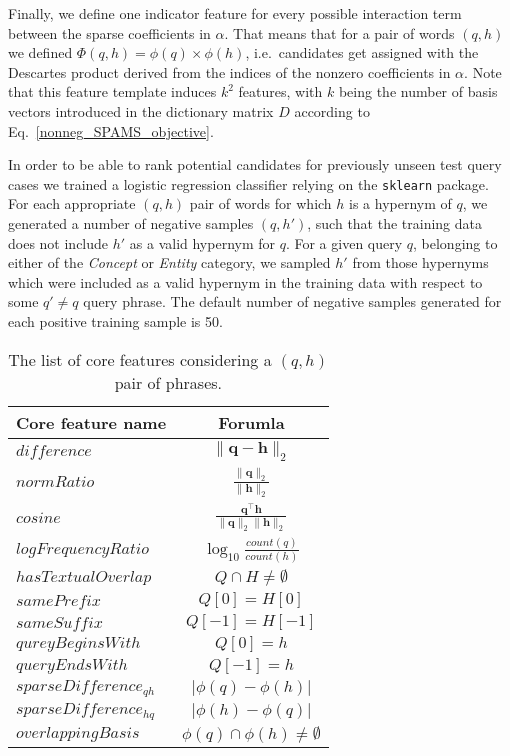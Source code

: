 \documentclass[11pt,a4paper]{article}
\begin{document}
Finally, we define one indicator feature for every possible interaction term
between the sparse coefficients in $\alpha$. That means that for a pair of
words $(q, h)$ we defined $\Phi(q,h)=\phi(q) \times \phi(h)$, i.e.~candidates
get assigned with the Descartes product derived from the indices of the nonzero
coefficients in $\alpha$. Note that this feature template induces $k^2$
features, with $k$ being the number of basis vectors introduced in the dictionary matrix $D$ according to Eq.~\ref{nonneg_SPAMS_objective}.

In order to be able to rank potential candidates for previously unseen test
query cases we trained a logistic regression classifier relying on the
\texttt{sklearn} package. For each appropriate $(q,h)$ pair of words for which
$h$ is a hypernym of $q$, we generated a number of negative samples $(q, h')$,
such that the training data does not include $h'$ as a valid hypernym for $q$.
For a given query $q$, belonging to either of the \textit{Concept} or
\textit{Entity} category, we sampled $h'$ from those hypernyms which were
included as a valid hypernym in the training data with respect to some $q' \neq
q$ query phrase. The default number of negative samples generated for each
positive training sample is 50.

\begin{table}
	\begin{tabular}{lc}
		Core feature name   & Forumla \\  \hline
		$difference$        & $\lVert \mathbf{q} - \mathbf{h} \rVert_2$ \\
		$normRatio$         & $\frac{\lVert \mathbf{q}\rVert_2}{\lVert \mathbf{h} \rVert_2}$ \\
		$cosine$            & $\frac{\mathbf{q}^\intercal \mathbf{h}}{\lVert \mathbf{q} \rVert_2\lVert \mathbf{h} \rVert_2}$ \\
    \midrule
		$logFrequencyRatio$ & $\log_{10}\frac{count(q)}{count(h)}$ \\
		$hasTextualOverlap$ & $Q \cap H \neq \emptyset$ \\
		$samePrefix$        & $Q[0] = H[0]$ \\
		$sameSuffix$        & $Q[-1] = H[-1]$ \\
		$qureyBeginsWith$   & $Q[0] = h$ \\
		$queryEndsWith$     & $Q[-1] = h$ \\
    \midrule
		$sparseDifference_{qh}$ & $\lvert \phi(q) - \phi(h) \rvert$ \\
		$sparseDifference_{hq}$ & $\lvert \phi(h) - \phi(q) \rvert$ \\
		$overlappingBasis$  & $\phi(q) \cap \phi(h) \neq \emptyset$ \\
	\end{tabular}
	\caption{The list of core features considering a $(q,h)$ pair of phrases.}
	\label{table:core_features}
\end{table}
\end{document}
